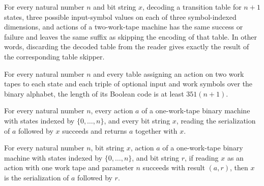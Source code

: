 \begin{lemma}
\label{Turing.codeEraseTable2}
\leanok
{}
For every natural number $n$ and bit string $x$, decoding a transition table for $n+1$
states, three possible input-symbol values on each of three symbol-indexed dimensions,
and actions of a two-work-tape machine has the same success or failure and leaves the
same suffix as skipping the encoding of that table. In other words, discarding the
decoded table from the reader gives exactly the result of the corresponding table
skipper.
\end{lemma}

\begin{lemma}
\label{Turing.codeTable2Bits_length}
\leanok
{}
For every natural number $n$ and every table assigning an action on two work tapes to
each state and each triple of optional input and work symbols over the binary alphabet,
the length of its Boolean code is at least $351(n+1)$.
\end{lemma}

\begin{lemma}
\label{Turing.codeReadActionK_one_append}
\leanok
{}
For every natural number $n$, every action $a$ of a one-work-tape binary machine with
states indexed by $\{0,\ldots,n\}$, and every bit string $x$, reading the serialization
of $a$ followed by $x$ succeeds and returns $a$ together with $x$.
\end{lemma}

\begin{lemma}
\label{Turing.codeReadActionK_one_sound}
\leanok
{}
For every natural number $n$, bit string $x$, action $a$ of a one-work-tape binary
machine with states indexed by $\{0,\ldots,n\}$, and bit string $r$, if reading $x$ as
an action with one work tape and parameter $n$ succeeds with result $(a,r)$, then $x$ is
the serialization of $a$ followed by $r$.
\end{lemma}

